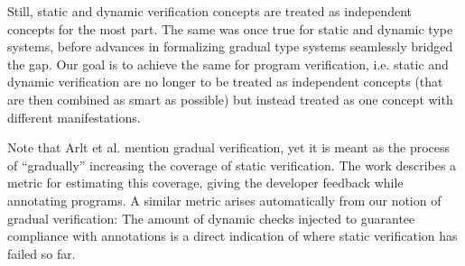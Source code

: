 Still, static and dynamic verification concepts are treated as independent concepts for the most part.
The same was once true for static and dynamic type systems, before advances in formalizing gradual type systems seamlessly bridged the gap.
Our goal is to achieve the same for program verification, i.e. static and dynamic verification are no longer to be treated as independent concepts (that are then combined as smart as possible) but instead treated as one concept with different manifestations.

Note that Arlt et al. \cite{arlt2014gradual} mention gradual verification, yet it is meant as the process of “gradually” increasing the coverage of static verification.
The work describes a metric for estimating this coverage, giving the developer feedback while annotating programs.
A similar metric arises automatically from our notion of gradual verification: The amount of dynamic checks injected to guarantee compliance with annotations is a direct indication of where static verification has failed so far.
